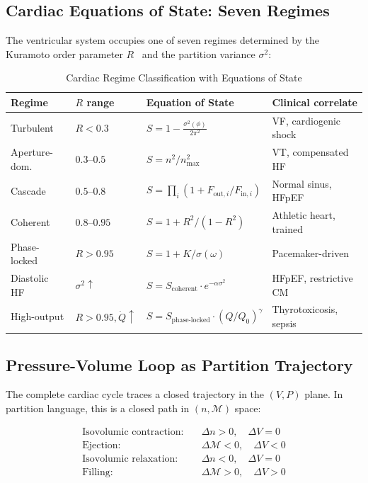 \documentclass[10pt,twocolumn,a4paper]{article}
\theoremstyle{definition}
\begin{document}
\subsection{Cardiac Equations of State: Seven Regimes}

The ventricular system occupies one of seven regimes determined by the
Kuramoto order parameter $R$~\cite{kuramoto1984chemical} and the partition variance $\sigma^2$:

\begin{table}[H]
\centering
\caption{Cardiac Regime Classification with Equations of State}
\label{tab:cardiac_regimes}
\begin{tabular}{llll}
\toprule
\textbf{Regime} & \textbf{$R$ range} & \textbf{Equation of State} & \textbf{Clinical correlate}\\
\midrule
Turbulent & $R < 0.3$ & $S = 1 - \frac{\sigma^2(\phi)}{2\pi^2}$ & VF, cardiogenic shock\\
Aperture-dom. & $0.3$--$0.5$ & $S = n^2/n^2_{\max}$ & VT, compensated HF\\
Cascade & $0.5$--$0.8$ & $S = \prod_i(1 + F_{\text{out},i}/F_{\text{in},i})$ & Normal sinus, HFpEF\\
Coherent & $0.8$--$0.95$ & $S = 1 + R^2/(1-R^2)$ & Athletic heart, trained\\
Phase-locked & $R > 0.95$ & $S = 1 + K/\sigma(\omega)$ & Pacemaker-driven\\
Diastolic HF & $\sigma^2 \uparrow$ & $S = S_{\text{coherent}} \cdot e^{-\alpha\sigma^2}$ & HFpEF, restrictive CM\\
High-output & $R > 0.95, \dot{Q}\uparrow$ & $S = S_{\text{phase-locked}} \cdot (Q/Q_0)^\gamma$ & Thyrotoxicosis, sepsis\\
\midrule
\end{tabular}
\end{table}

\subsection{Pressure-Volume Loop as Partition Trajectory}

The complete cardiac cycle traces a closed trajectory in the $(V, P)$ plane.
In partition language, this is a closed path in $(n, \mathcal{M})$ space:

\begin{align}
\text{Isovolumic contraction:} &\quad \Delta n > 0, \quad \Delta V = 0\\
\text{Ejection:} &\quad \Delta \mathcal{M} < 0, \quad \Delta V < 0\\
\text{Isovolumic relaxation:} &\quad \Delta n < 0, \quad \Delta V = 0\\
\text{Filling:} &\quad \Delta \mathcal{M} > 0, \quad \Delta V > 0
\end{align}
\end{document}
